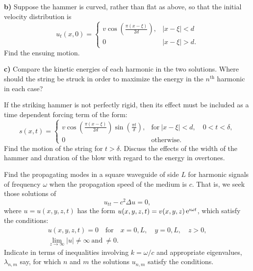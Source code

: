 {\begin{Exercise}
  \textbf{b)}
  Suppose the hammer is curved, rather than flat as above, so that the initial 
  velocity distribution is
  \[
  u_t(x, 0) = 
  \begin{cases}
    v \cos \left( \frac{\pi(x-\xi)}{2d} \right), &|x-\xi| < d \\
    0 &|x-\xi| > d.
  \end{cases}
  \]
  Find the ensuing motion.

  \textbf{c)}
  Compare the kinetic energies of each harmonic in the two solutions.  Where 
  should the string be struck in order to maximize the energy in the 
  $n^{\mathrm{th}}$ harmonic in each case?


\end{Exercise}







\begin{Exercise}
  \label{exercise piano string time dependent forcing}
  If the striking hammer is not perfectly rigid, then its effect must be 
  included as a time dependent forcing term of the form:
  \[
  s(x, t) = \begin{cases}
    v \cos\left( \frac{\pi(x-\xi)}{2d} \right) 
    \sin\left( \frac{\pi t}{\delta} \right),
    &\mathrm{for}\ |x-\xi| < d, \quad 0 < t < \delta, \\
    0 &\mathrm{otherwise}.
  \end{cases}
  \]
  Find the motion of the string for $t > \delta$.  Discuss the effects of the
  width of the hammer and duration of the blow with regard to the energy
  in overtones.

\end{Exercise}





\begin{Exercise}
  \label{exercise propagating modes square waveguide}
  Find the propagating modes in a square waveguide of side $L$ for harmonic
  signals of frequency $\omega$ when the propagation speed of the medium
  is $c$.  That is, we seek those solutions of 
  \[
  u_{t t} - c^2 \Delta u = 0,
  \]
  where $u = u(x, y, z, t)$ has the form 
  $u(x, y, z, t) = v(x, y, z) \mathop{\mathrm{e}}\nolimits^{\imath \omega t}$, which satisfy the conditions:
  \begin{gather*}
    u(x, y, z, t) = 0 \quad \mathrm{for} \quad x = 0,L, \quad y = 0,L, \quad z > 0,\\
    \lim_{z \to \infty} |u| \neq \infty\ \mathrm{and}\ \neq 0.
  \end{gather*}
  Indicate in terms of inequalities involving $k = \omega / c$ and appropriate
  eigenvalues, $\lambda_{n,m}$ say, for which $n$ and $m$ the solutions
  $u_{n,m}$ satisfy the conditions.


\end{Exercise}}
